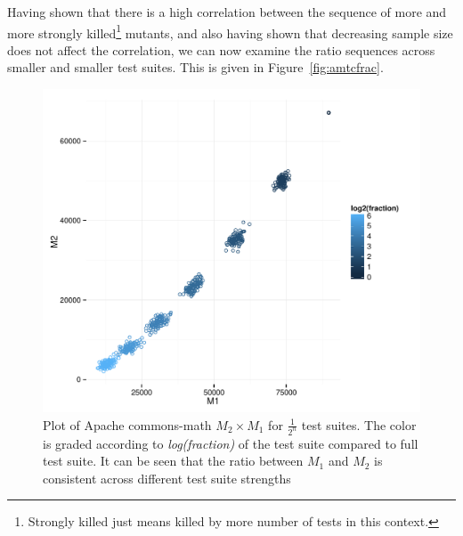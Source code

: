 \documentclass[conference]{IEEEtran}
\begin{document}
Having shown that there is a high correlation between the sequence of
more and more strongly killed\footnote{Strongly killed just means killed by
more number of tests in this context.} mutants, and also having shown that
decreasing sample size does not affect the correlation, we can now examine the
ratio sequences across smaller and smaller test suites. This is given in
Figure~\ref{fig:amtcfrac}.
\begin{figure}
\begin{Schunk}


{\centering \includegraphics[width=.99\linewidth]{twocolumn-unnamed-chunk-21} 

}

\end{Schunk}

\caption{Plot of Apache commons-math $M_2\times M_1$ for $\frac{1}{2^n}$ test suites. The color is graded according to \emph{log(fraction)} of the test suite compared to full test suite. It can be seen that the ratio between $M_1$ and $M_2$ is consistent across different test suite strengths}
\label{fig:amkill1}
\end{figure}
\end{document}
